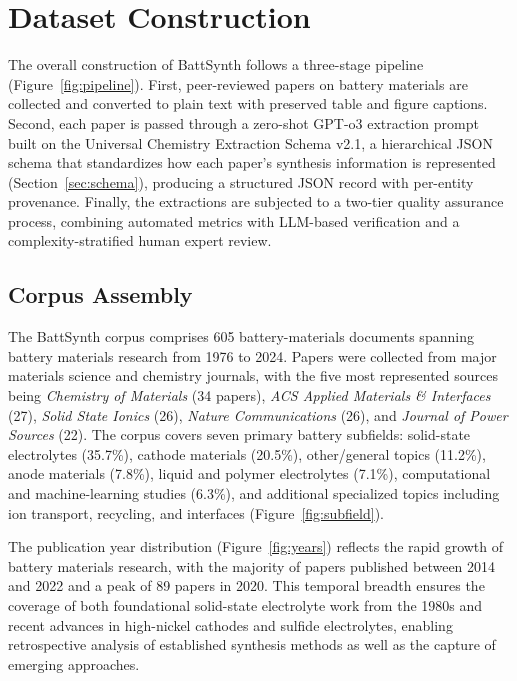 \documentclass[12pt,a4paper]{article}
\begin{document}
\section{Dataset Construction}
\label{sec:construction}

The overall construction of BattSynth follows a three-stage pipeline (Figure~\ref{fig:pipeline}). First, peer-reviewed papers on battery materials are collected and converted to plain text with preserved table and figure captions. Second, each paper is passed through a zero-shot GPT-o3 extraction prompt built on the Universal Chemistry Extraction Schema v2.1, a hierarchical JSON schema that standardizes how each paper's synthesis information is represented (Section~\ref{sec:schema}), producing a structured JSON record with per-entity provenance. Finally, the extractions are subjected to a two-tier quality assurance process, combining automated metrics with LLM-based verification and a complexity-stratified human expert review.

\subsection{Corpus Assembly}
\label{sec:corpus}

The BattSynth corpus comprises 605 battery-materials documents spanning battery materials research from 1976 to 2024. Papers were collected from major materials science and chemistry journals, with the five most represented sources being \textit{Chemistry of Materials} (34 papers), \textit{ACS Applied Materials \& Interfaces} (27), \textit{Solid State Ionics} (26), \textit{Nature Communications} (26), and \textit{Journal of Power Sources} (22). The corpus covers seven primary battery subfields: solid-state electrolytes (35.7\%), cathode materials (20.5\%), other/general topics (11.2\%), anode materials (7.8\%), liquid and polymer electrolytes (7.1\%), computational and machine-learning studies (6.3\%), and additional specialized topics including ion transport, recycling, and interfaces (Figure~\ref{fig:subfield}).

The publication year distribution (Figure~\ref{fig:years}) reflects the rapid growth of battery materials research, with the majority of papers published between 2014 and 2022 and a peak of 89 papers in 2020. This temporal breadth ensures the coverage of both foundational solid-state electrolyte work from the 1980s and recent advances in high-nickel cathodes and sulfide electrolytes, enabling retrospective analysis of established synthesis methods as well as the capture of emerging approaches.
\end{document}
